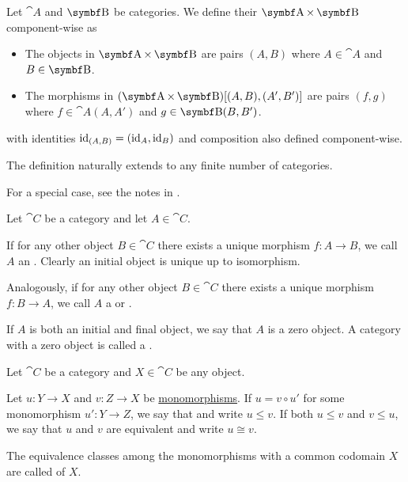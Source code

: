 \begin{definition}\label{def:product_category}\mcite\cite[exer. 1.1.14]{Leinster2014}
  Let \( \cat{A} \) and \( \bop B \) be categories. We define their  \( \cat{A} \times \bop B \) component-wise as
  \begin{itemize}
    \item The objects in \( \cat{A} \times \bop B \) are pairs \( (A, B) \) where \( A \in \cat{A} \) and \( B \in \bop B \).
    \item The morphisms in \( (\cat{A} \times \bop B)[(A, B), (A', B')] \) are pairs \( (f, g) \) where \( f \in \cat{A}(A, A') \) and \( g \in \bop{B}(B, B') \).
  \end{itemize}
  with identities \( \operatorname{id}_{(A,B)} =(\operatorname{id}_A, \operatorname{id}_B) \) and composition also defined component-wise.

  The definition naturally extends to any finite number of categories.

  For a special case, see the notes in .
\end{definition}

\begin{definition}\label{def:zero_objects}\mcite\cite[def. 2.1.7]{Leinster2014}
  Let \( \cat{C} \) be a category and let \( A \in \cat{C} \).

  \begin{defenum}
     If for any other object \( B \in \cat{C} \) there exists a unique morphism \( f: A \to B \), we call \( A \) an . Clearly an initial object is unique up to isomorphism.

     Analogously, if for any other object \( B \in \cat{C} \) there exists a unique morphism \( f: B \to A \), we call \( A \) a  or .

     If \( A \) is both an initial and final object, we say that \( A \) is a zero object. A category with a zero object is called a .
  \end{defenum}
\end{definition}

\begin{definition}\label{def:categorical_subobject}\mcite\cite[122]{MacLane1994}
  Let \( \cat{C} \) be a category and \( X \in \cat{C} \) be any object.

  Let \( u: Y \to X \) and \( v: Z \to X \) be \hyperref[def:morphism_invertibility]{monomorphisms}. If \( u = v \circ u' \) for some monomorphism \( u': Y \to Z \), we say that  and write \( u \leq v \). If both \( u \leq v \) and \( v \leq u \), we say that \( u \) and \( v \) are equivalent and write \( u \cong v \).

  The equivalence classes among the monomorphisms with a common codomain \( X \) are called  of \( X \).
\end{definition}
